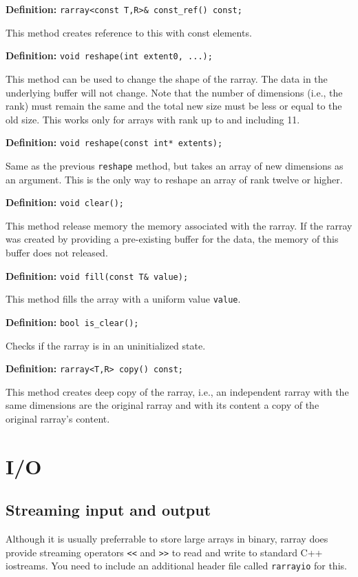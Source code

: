 \documentclass[11pt,twoside]{article}
\begin{document}
\noindent\textbf{Definition:} \texttt{rarray{\tt<}const T,R{\tt>}\& const\_ref() const;}

This method creates reference to this with const elements.

\noindent\textbf{Definition:} \texttt{void reshape(int extent0, ...);}

This method can be used to change the shape of the rarray. The data in
the underlying buffer will not change. Note that the number of
dimensions (i.e., the rank) must remain the same and the total new size must be less or equal to the old size.  This works only for arrays with rank up to and including 11. 

\noindent\textbf{Definition:} \texttt{void reshape(const int* extents);}

Same as the previous \texttt{reshape} method, but takes an array of new dimensions as an argument.  This is the only way to reshape an array of rank twelve or higher.

\noindent\textbf{Definition:} \texttt{void clear();}

This method release memory the memory associated with the rarray. If the rarray was created by providing a pre-existing buffer for the data, the memory of this buffer does not released.

\noindent\textbf{Definition:} \texttt{void fill(const T\& value);}

This method fills the array with a uniform value \texttt{value}.

\noindent\textbf{Definition:} \texttt{bool is\_clear();}

Checks if the rarray is in an uninitialized state.

\noindent\textbf{Definition:} \texttt{rarray{\tt<}T,R{\tt>} copy() const;}

This method creates deep copy of the rarray, i.e., an independent rarray with the same dimensions are the original rarray and with its content a copy of the original rarray's content.

\section{I/O}

\subsection{Streaming input and output}

Although it is usually preferrable to store large arrays in binary, rarray does provide streaming operators \texttt{<<} and \texttt{>>} to read and write to standard C++ iostreams.  You need to include an additional header file called \texttt{rarrayio} for this.
\end{document}
